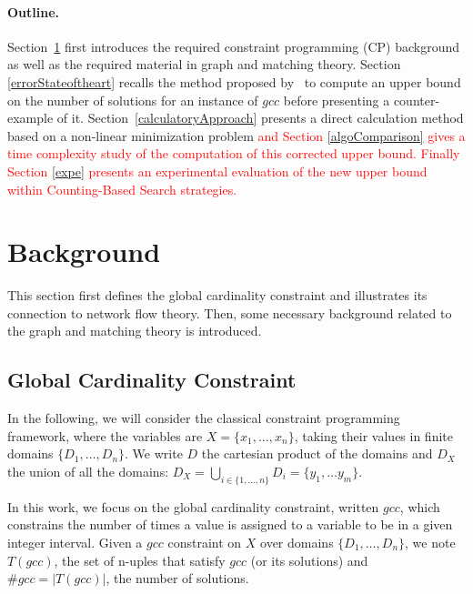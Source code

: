 \documentclass[jair,twoside,11pt,theapa]{article}
\newcommand{\major}[1]{\textcolor{red}{#1}}
\newcommand{\var}[1]{x_{#1}}
\newcommand{\Domain}{D}
\newcommand{\domainof}[1]{\Domain_{#1}}
\newcommand{\nbVars}{n}
\newcommand{\setofVars}[2]{\lbrace \var{#1}, \ldots , \var{#2} \rbrace }
\newcommand{\fromto}[3]{#1 \in \lbrace #2, \ldots, #3 \rbrace}
\newcommand{\setoftuples}[1]{T(#1)}
\newcommand{\numberofsolutions}[1]{\# #1}
\begin{document}
\paragraph{Outline.} Section~\ref{previous} first introduces the required constraint programming (CP) background as well as the required material in graph and matching theory. Section \ref{errorStateoftheart} recalls the method proposed by~\cite{PesantQZ12} to compute an upper bound on the number of solutions for an instance of $gcc$ before presenting a counter-example of it. Section~\ref{calculatoryApproach} presents a direct calculation method based on a non\--linear minimization problem \major{and Section \ref{algoComparison} gives a time complexity study of the computation of this corrected upper bound. Finally Section \ref{expe} presents an experimental evaluation of the new upper bound within Counting-Based Search strategies.}

\section{Background}
\label{previous} 
This section first defines the global cardinality constraint and illustrates its connection to network flow theory. Then, some necessary background related to the graph and matching theory is introduced. %

\subsection{Global Cardinality Constraint}
In the following, we will consider the classical constraint programming framework, where the variables are $X = \setofVars{1}{\nbVars}$, taking their values in finite domains $\lbrace \domainof{1}, \ldots, \domainof{\nbVars} \rbrace$. We write $\Domain$ the cartesian product of the domains and $D_X$ the union of all the domains: $D_X=\underset{ \fromto{i}{1}{\nbVars} }{ \bigcup } \domainof{i}=\lbrace y_1, \ldots y_m \rbrace$.

In this work, we focus on the global cardinality constraint, written $gcc$, which constrains the number of times a value is assigned to a variable to be in a given integer interval.
% 
Given a $gcc$ constraint on $X$ over domains $\lbrace \domainof{1}, \ldots, \domainof{\nbVars} \rbrace$, we note $\setoftuples{gcc}$, the set of n-uples that satisfy $gcc$ (or its solutions) and $\numberofsolutions{gcc} = |\setoftuples{gcc}|$, the number of solutions.

	
\end{document}
